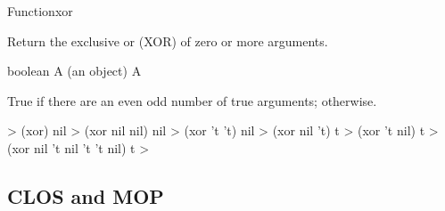 \documentclass[10pt,twoside,english,pdftex]{article}
\begin{document}

\begin{functiondoc}{Function}{xor}{  
   \returns{} }

\fnsyntax

\fnpurpose Return the exclusive or (XOR) of zero or more arguments.

\fnpackage {}

\fnmodule {}

\fnargs
\begin{args}{boolean}
\arg[arg] A  (an object)
\arg[boolean] A 
\end{args}

\fnreturns True if there are an even odd number of true arguments; \nil{}
otherwise.

\fnexamples
%
\W\supp
\begin{example}
  > (xor)
  nil
  > (xor nil nil)
  nil
  > (xor 't 't)
  nil\goodpagebreak
  > (xor nil 't)
  t
  > (xor 't nil)
  t
  > (xor nil 't nil 't 't nil)
  t
  >
\end{example}

\end{functiondoc}


\W\renewcommand{\subsubentities}{1}


\T\markright{}%
\T\pagestyle{plain}
\T\clearpage
\W{}
\T\pagestyle{fancy}
\T\thispagestyle{fancybottom}
\T\global\def\fnlastname{ }%

\subsection{CLOS and MOP}
\label{sec:CLOS}%
\end{document}
